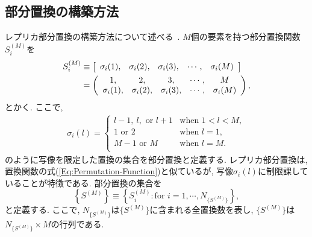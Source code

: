 \subsection{部分置換の構築方法}
レプリカ部分置換の構築方法について述べる~\cite{Yamauchi2019}. 
$M$個の要素を持つ部分置換関数$S_{i}^{(M)}$を
\begin{alignat}{5}
    S_{i}^{(M)}
   &\equiv
    \left[
    \begin{array}{ccccc}
     \sigma_{i}(1), & \sigma_{i}(2), & \sigma_{i}(3), & \cdots, & \sigma_{i}(M) \\
    \end{array}
    \right]
    \notag
    \\
   &=
    \left(
    \begin{array}{ccccc}
     1,             & 2,             & 3,             & \cdots, & M             \\
     \sigma_{i}(1), & \sigma_{i}(2), & \sigma_{i}(3), & \cdots, & \sigma_{i}(M) \\
    \end{array}
    \right),
\end{alignat}
とかく. ここで, 
\begin{align}
    \sigma_{i}(l)
    =
    \begin{cases}
      l-1,~ l, \text{ or } l+1  &\text{when $1 < l < M$}, \\
        1      \text{ or } 2    &\text{when $l = 1$},     \\
      M-1      \text{ or } M    &\text{when $l = M$}.     \\
    \end{cases}
\end{align}
のように写像を限定した置換の集合を部分置換と定義する. 
レプリカ部分置換は, 置換関数の式(\ref{Eq:Permutation-Function})と似ているが, 写像$\sigma_{i}(l)$に制限課していることが特徴である. 
部分置換の集合を
\begin{equation}
	\left\{S^{(M)}\right\}
    \equiv
    \left\{S_{i}^{(M)}: \text{for $i = 1, \cdots, N_{\{S^{(M)}\}}$} \right\},
\end{equation}
と定義する. 
ここで, $N_{\{S^{(M)}\}}$は$\{S^{(M)}\}$に含まれる全置換数を表し, 
$\{S^{(M)}\}$は$N_{\{S^{(M)}\}} \times M$の行列である. 

